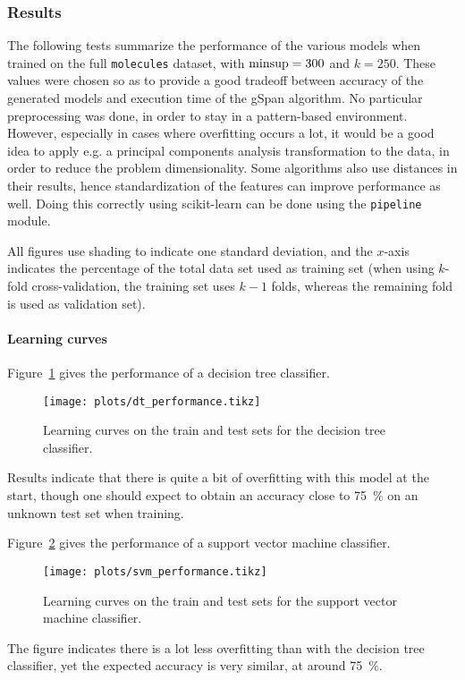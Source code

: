 \documentclass{sigkddExp}
\newcommand{\py}[1]{\texttt{#1}}
\newcommand{\gspan}{\textsf{gSpan}}
\begin{document}
\subsubsection{Results}
The following tests summarize the performance of the various models when trained on the full \texttt{molecules} dataset, with \(\textnormal{minsup} = 300\) and \(k = 250\).
These values were chosen so as to provide a good tradeoff between accuracy of the generated models and execution time of the \gspan{} algorithm.
No particular preprocessing was done, in order to stay in a pattern-based environment.
However, especially in cases where overfitting occurs a lot, it would be a good idea to apply e.g. a principal components analysis transformation to the data, in order to reduce the problem dimensionality.
Some algorithms also use distances in their results, hence  standardization of the features can improve performance as well.
Doing this correctly using scikit-learn can be done using the \py{pipeline} module.

All figures use shading to indicate one standard deviation, and the \(x\)-axis indicates the percentage of the total data set used as training set (when using \(k\)-fold cross-validation, the training set uses \(k-1\) folds, whereas the remaining fold is used as validation set).

\paragraph{Learning curves}
Figure~\ref{fig:dt_performance} gives the performance of a decision tree classifier.
\begin{figure}[!hbtp]
	\centering
	\texttt{[image: plots/dt\_performance.tikz]}
	\caption{Learning curves on the train and test sets for the decision tree classifier.}
	\label{fig:dt_performance}
\end{figure}
Results indicate that there is quite a bit of overfitting with this model at the start, though one should expect to obtain an accuracy close to \SI{75}{\percent} on an unknown test set when training.

Figure~\ref{fig:svm_performance} gives the performance of a support vector machine classifier.
\begin{figure}[!hbtp]
	\centering
	\texttt{[image: plots/svm\_performance.tikz]}
	\caption{Learning curves on the train and test sets for the support vector machine classifier.}
	\label{fig:svm_performance}
\end{figure}
The figure indicates there is a lot less overfitting than with the decision tree classifier, yet the expected accuracy is very similar, at around \SI{75}{\percent}.
\end{document}
